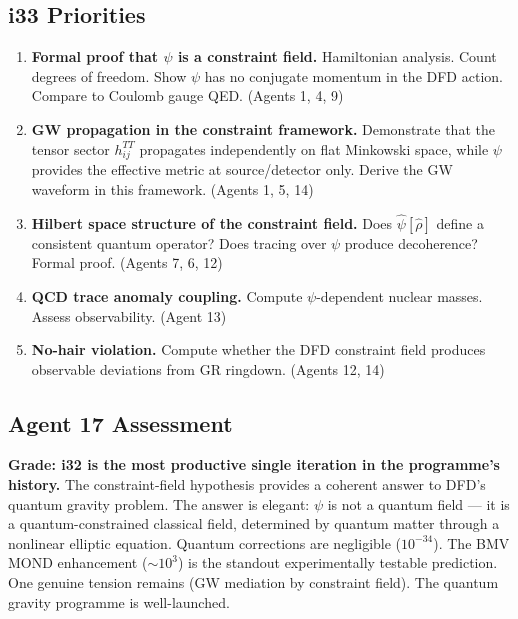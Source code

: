 \documentclass[11pt,a4paper]{article}
\begin{document}
\subsection{i33 Priorities}
\label{sec:i33-priorities}

\begin{enumerate}
\item \textbf{Formal proof that $\psi$ is a constraint field.} Hamiltonian analysis. Count degrees of freedom. Show $\psi$ has no conjugate momentum in the DFD action. Compare to Coulomb gauge QED. (Agents 1, 4, 9)

\item \textbf{GW propagation in the constraint framework.} Demonstrate that the tensor sector $h_{ij}^{TT}$ propagates independently on flat Minkowski space, while $\psi$ provides the effective metric at source/detector only. Derive the GW waveform in this framework. (Agents 1, 5, 14)

\item \textbf{Hilbert space structure of the constraint field.} Does $\hat\psi[\hat\rho]$ define a consistent quantum operator? Does tracing over $\psi$ produce decoherence? Formal proof. (Agents 7, 6, 12)

\item \textbf{QCD trace anomaly coupling.} Compute $\psi$-dependent nuclear masses. Assess observability. (Agent 13)

\item \textbf{No-hair violation.} Compute whether the DFD constraint field produces observable deviations from GR ringdown. (Agents 12, 14)
\end{enumerate}

\subsection{Agent 17 Assessment}

\textbf{Grade: i32 is the most productive single iteration in the programme's history.} The constraint-field hypothesis provides a coherent answer to DFD's quantum gravity problem. The answer is elegant: $\psi$ is not a quantum field --- it is a quantum-constrained classical field, determined by quantum matter through a nonlinear elliptic equation. Quantum corrections are negligible ($10^{-34}$). The BMV MOND enhancement ($\sim 10^3$) is the standout experimentally testable prediction. One genuine tension remains (GW mediation by constraint field). The quantum gravity programme is well-launched.
\end{document}
